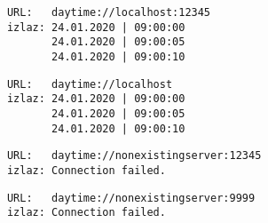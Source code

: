\documentclass[]{article}
\begin{document}
\begin{enumerate}
  \vspace{10pt}
  \noindent
    \begin{lstlisting}
      URL:   daytime://localhost:12345
      izlaz: 24.01.2020 | 09:00:00
             24.01.2020 | 09:00:05
             24.01.2020 | 09:00:10
    \end{lstlisting}
    \begin{lstlisting}
      URL:   daytime://localhost
      izlaz: 24.01.2020 | 09:00:00
             24.01.2020 | 09:00:05
             24.01.2020 | 09:00:10
    \end{lstlisting}
    \begin{lstlisting}
      URL:   daytime://nonexistingserver:12345
      izlaz: Connection failed.
    \end{lstlisting}
    \begin{lstlisting}
      URL:   daytime://nonexistingserver:9999
      izlaz: Connection failed.
    \end{lstlisting}
\end{enumerate}
\end{document}
